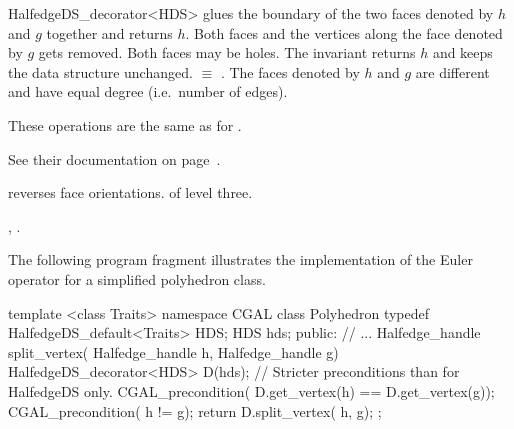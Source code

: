 \begin{ccRefClass}{HalfedgeDS_decorator<HDS>}
   {glues the boundary of the two faces denoted by $h$ and $g$ together 
    and returns $h$. Both faces and the vertices along the face denoted
    by $g$ gets removed. Both faces may be holes. The invariant 
     returns $h$ and keeps the 
    data structure unchanged.
    \ccPrecond {} $\equiv$ .
    The faces denoted by $h$ and $g$ are different and have
    equal degree (i.e.~number of edges).} 



These operations are the same as for 
.
\begin{ccTexOnly}
    See their documentation on page~\pageref{pageHalfedgeDSconstDecoratorRef}.
\end{ccTexOnly}




    {reverses face orientations. \ccPrecond {} of level three.}


\ccSeeAlso

,
.


\ccExample

The following program fragment illustrates the implementation of the
Euler operator  for a simplified polyhedron class.

\begin{ccExampleCode}
template <class Traits>
namespace CGAL {
    class Polyhedron {
        typedef HalfedgeDS_default<Traits> HDS;
        HDS hds;
    public:
        // ...
        Halfedge_handle split_vertex( Halfedge_handle h, Halfedge_handle g) {
            HalfedgeDS_decorator<HDS> D(hds);
            // Stricter preconditions than for HalfedgeDS only.
            CGAL_precondition( D.get_vertex(h) == D.get_vertex(g));
            CGAL_precondition( h != g);
            return D.split_vertex( h, g);
        }
    };
}
\end{ccExampleCode}

\end{ccRefClass}

\ccRefPageEnd


